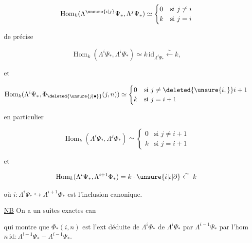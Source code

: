 
\[
\operatorname{Hom}_k(\Lambda^{\unsure{i|j}}\Psi_{\ast},\Lambda^j\Psi_{\ast})\simeq
\begin{cases}0&\text{si }j\ne i\\k&\text{si }j=i\end{cases}
\]

de  précise

\[
\operatorname{Hom}_k(\Lambda^i\Psi_{\ast},\Lambda^i\Psi_{\ast})\simeq k\,\mathrm{id}_{\Lambda^i\Psi_{\ast}}\xleftarrow{\sim} k,
\]

et

\[
\operatorname{Hom}_k(\Lambda^i\Psi_{\ast},\Phi_{\deleted{\unsure{j|\bullet}}}(j,n))\simeq
\begin{cases}0&\text{si }j\ne\deleted{\unsure{i,}}i+1\\k&\text{si }j=i+1\end{cases}
\]

en particulier

\[
\operatorname{Hom}_k(\Lambda^i\Psi_{\ast},\Lambda^j\Phi_{\ast})\simeq
\begin{cases}0&\text{si }j\ne i+1\\k&\text{si }j=i+1\end{cases}
\]

et

\[
\operatorname{Hom}_k(\Lambda^i\Psi_{\ast},\Lambda^{i+1}\Phi_{\ast})=k\cdot\unsure{i|\iota|\partial}\xleftarrow{\sim}k
\]

où $i:\Lambda^i\Psi_{\ast}\hookrightarrow\Lambda^{i+1}\Phi_{\ast}$ est l'inclusion canonique.

\uline{NB} On a un  suites exactes can


qui montre que $\Phi_{\ast}(i,n)$ est l'ext déduite de  $\Lambda^i\Phi_{\ast}$ de $\Lambda^i\Psi_{\ast}$ par $\Lambda^{i-1}\Psi_{\ast}$ par l'hom $n\,\mathrm{id}:\Lambda^{i-1}\Psi_{\ast}\mathrel{-}\Lambda^{i-1}\Psi_{\ast}$.

